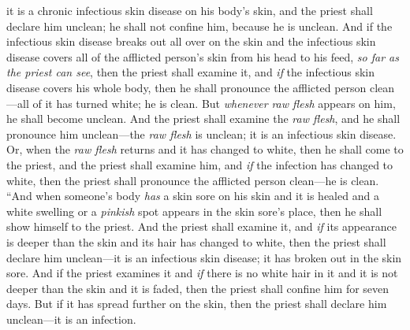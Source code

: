 \begin{biblechapter}
\verse it is a chronic infectious skin disease on his body’s skin, and the priest shall declare him unclean; he shall not confine him, because he is unclean.
\verse And if the infectious skin disease breaks out all over on the skin and the infectious skin disease covers all of the afflicted person’s skin from his head to his feed, \textit{so far as the priest can see},
\verse then the priest shall examine it, and \textit{if} the infectious skin disease covers his whole body, then he shall pronounce the afflicted person clean—all of it has turned white; he is clean.
\verse But \textit{whenever} \textit{raw flesh} appears on him, he shall become unclean.
\verse And the priest shall examine the \textit{raw flesh}, and he shall pronounce him unclean—the \textit{raw flesh} is unclean; it is an infectious skin disease.
\verse Or, when the \textit{raw flesh} returns and it has changed to white, then he shall come to the priest,
\verse and the priest shall examine him, and \textit{if} the infection has changed to white, then the priest shall pronounce the afflicted person clean—he is clean.
\verse “And when someone’s body \textit{has} a skin sore on his skin and it is healed
\verse and a white swelling or a \textit{pinkish} spot appears in the skin sore’s place, then he shall show himself to the priest.
\verse And the priest shall examine it, and \textit{if} its appearance is deeper than the skin and its hair has changed to white, then the priest shall declare him unclean—it is an infectious skin disease; it has broken out in the skin sore.
\verse And if the priest examines it and \textit{if} there is no white hair in it and it is not deeper than the skin and it is faded, then the priest shall confine him for seven days.
\verse But if it has spread further on the skin, then the priest shall declare him unclean—it is an infection.

\end{biblechapter}
